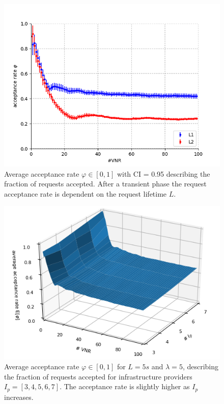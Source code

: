 \begin{figure}[bth]
	\centering
	\includegraphics[scale=0.65]{gfx/ev_acceptance_rate.png}    
  	\caption{Average acceptance rate $\varphi \in [0,1]$ with CI = 0.95 describing the fraction of requests accepted. After a transient phase the request acceptance rate is dependent on the request lifetime $L$.}
  	\label{fig:acceptance_rate}
\end{figure}

\begin{figure}[h!]
	\centering
	\includegraphics[scale=0.9]{gfx/ev_acceptance_rate3D.png}    
  	\caption{Average acceptance rate $\varphi \in [0,1]$ for $L = 5s$ and $\lambda = 5$, describing the fraction of requests accepted for infrastructure providers $I_p =[3,4,5,6,7]$. The acceptance rate is slightly higher as $I_p$ increases.}
  	\label{fig:acceptance_rate_3D}
\end{figure}

